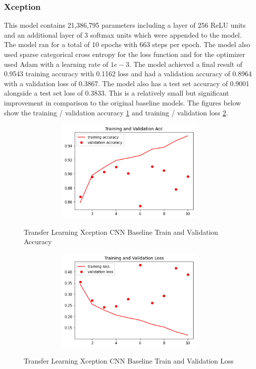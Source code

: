 \subsubsection{Xception}
This model contains 21,386,795 parameters including a layer of 256 ReLU units and an additional layer of 3 softmax units which were appended to the model. The model ran for a total of 10 epochs with 663 steps per epoch.  The model also used sparse categorical cross entropy for the loss function and for the optimizer used Adam with a learning rate of $1e-3$. The model achieved a final result of 0.9543 training accuracy with  0.1162  loss and had a validation accuracy of 0.8964 with a validation loss of 0.3867.  The model also has a test set accuracy of 0.9001 alongside a test set loss of 0.3833.  This is a relatively small but significant improvement in comparison to the original baseline models.  The figures below show the training / validation accuracy \ref{fig:Transfer Learning Xception CNN Baseline Train and Validation Accuracy Radiography} and training / validation loss \ref{fig:Transfer Learning Xception CNN Baseline Train and Validation Loss Radiography}. 
 \begin{figure}[H]
    \centering
    \includegraphics[width=1\textwidth,height=5cm,keepaspectratio]{Images/XceptionBaselineTrainingValidationAccRadiography.png}\\
    \caption{Transfer Learning Xception CNN Baseline Train and Validation Accuracy}
    \label{fig:Transfer Learning Xception CNN Baseline Train and Validation Accuracy Radiography}
\end{figure}
 \begin{figure}[H]
    \centering    \includegraphics[width=1\textwidth,height=5cm,keepaspectratio]{Images/XceptionBaselineTrainingValidationLossRadiography.png}\\
    \caption{Transfer Learning Xception CNN Baseline Train and Validation Loss}
    \label{fig:Transfer Learning Xception CNN Baseline Train and Validation Loss Radiography}
\end{figure}
